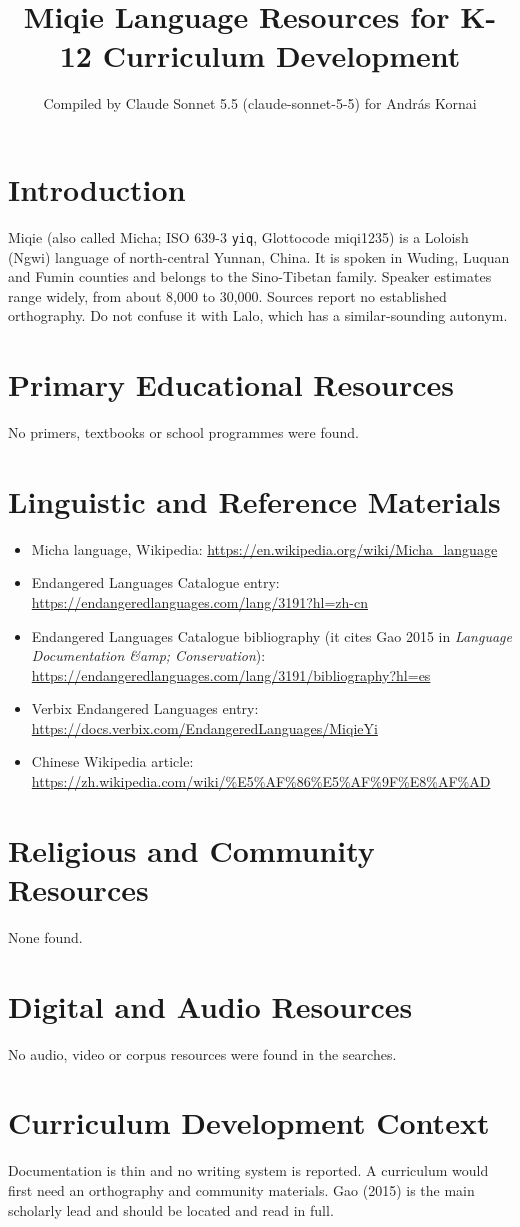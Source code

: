 \documentclass[12pt]{article}
\title{Miqie Language Resources for K-12 Curriculum Development}
\author{Compiled by Claude Sonnet 5.5 (claude-sonnet-5-5) for Andr\'as Kornai}
\date{}
\begin{document}
\maketitle

\section{Introduction}
Miqie (also called Micha; ISO 639-3 \texttt{yiq}, Glottocode miqi1235) is a Loloish (Ngwi) language of north-central Yunnan, China. It is spoken in Wuding, Luquan and Fumin counties and belongs to the Sino-Tibetan family. Speaker estimates range widely, from about 8,000 to 30,000. Sources report no established orthography. Do not confuse it with Lalo, which has a similar-sounding autonym.

\section{Primary Educational Resources}
No primers, textbooks or school programmes were found.

\section{Linguistic and Reference Materials}
\begin{itemize}
\item Micha language, Wikipedia: \url{https://en.wikipedia.org/wiki/Micha_language}
\item Endangered Languages Catalogue entry: \url{https://endangeredlanguages.com/lang/3191?hl=zh-cn}
\item Endangered Languages Catalogue bibliography (it cites Gao 2015 in \emph{Language Documentation \&amp; Conservation}): \url{https://endangeredlanguages.com/lang/3191/bibliography?hl=es}
\item Verbix Endangered Languages entry: \url{https://docs.verbix.com/EndangeredLanguages/MiqieYi}
\item Chinese Wikipedia article: \url{https://zh.wikipedia.com/wiki/%E5%AF%86%E5%AF%9F%E8%AF%AD}
\end{itemize}

\section{Religious and Community Resources}
None found.

\section{Digital and Audio Resources}
No audio, video or corpus resources were found in the searches.

\section{Curriculum Development Context}
Documentation is thin and no writing system is reported. A curriculum would first need an orthography and community materials. Gao (2015) is the main scholarly lead and should be located and read in full.
\end{document}
